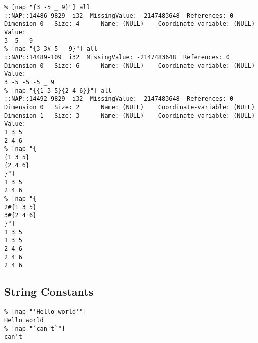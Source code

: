     \begin{verbatim}
% [nap "{3 -5 _ 9}"] all
::NAP::14486-9829  i32  MissingValue: -2147483648  References: 0
Dimension 0   Size: 4      Name: (NULL)    Coordinate-variable: (NULL)
Value:
3 -5 _ 9
% [nap "{3 3#-5 _ 9}"] all
::NAP::14489-109  i32  MissingValue: -2147483648  References: 0
Dimension 0   Size: 6      Name: (NULL)    Coordinate-variable: (NULL)
Value:
3 -5 -5 -5 _ 9
% [nap "{{1 3 5}{2 4 6}}"] all
::NAP::14492-9829  i32  MissingValue: -2147483648  References: 0
Dimension 0   Size: 2      Name: (NULL)    Coordinate-variable: (NULL)
Dimension 1   Size: 3      Name: (NULL)    Coordinate-variable: (NULL)
Value:
1 3 5
2 4 6
% [nap "{
{1 3 5}
{2 4 6}
}"]
1 3 5
2 4 6
% [nap "{
2#{1 3 5}
3#{2 4 6}
}"]
1 3 5
1 3 5
2 4 6
2 4 6
2 4 6
\end{verbatim}

\subsection{String Constants}

    \begin{verbatim}
% [nap "'Hello world'"]
Hello world
% [nap "`can't`"]
can't
\end{verbatim}

